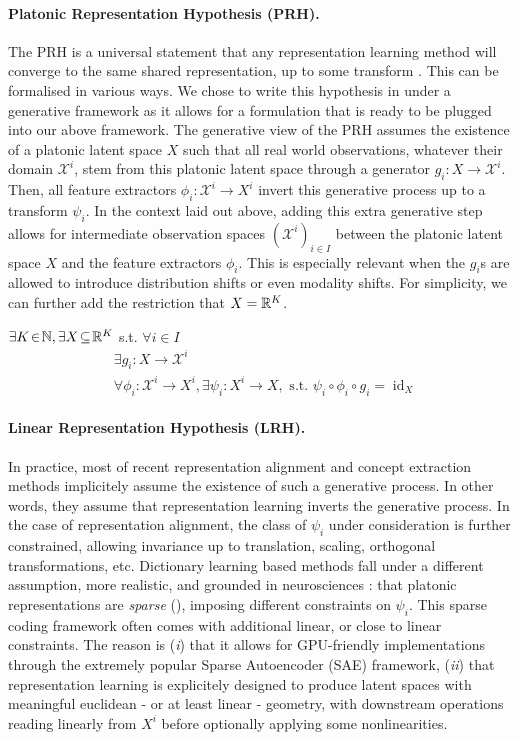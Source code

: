 \documentclass{article}
\begin{document}
\paragraph{Platonic Representation Hypothesis (PRH).} The PRH is a universal statement that any representation learning method will converge to the same shared representation, up to some transform \citep{TODO}. This can be formalised in various ways. We chose to write this hypothesis in under a generative framework as it allows for a formulation that is ready to be plugged into our above framework. The generative view of the PRH assumes the existence of a platonic latent space $X$ such that all real world observations, whatever their domain $\mathcal{X}^i$, stem from this platonic latent space through a generator $g_i : X \to \mathcal{X}^i$. Then, all feature extractors $\phi_i : \mathcal{X}^i \to X^i$ invert this generative process up to a transform $\psi_i$. In the context laid out above, adding this extra generative step allows for intermediate observation spaces $(\mathcal{X}^i)_{i \in I}$ between the platonic latent space $X$ and the feature extractors $\phi_i$. This is especially relevant when the $g_i$s are allowed to introduce distribution shifts or even modality shifts. For simplicity, we can further add the restriction that $X = \mathbb{R}^K$.

\begin{hypothesis}
\label{hyp:generative_process}
$\exists K\!\in\!\mathbb{N}, \exists X\!\subseteq\!\mathbb{R}^{K}$ s.t. $\forall i\!\in\!I$
%
\begin{align}
    &\exists g_i:X\!\to\!\mathcal{X}^i\\
    &\forall \phi_i:\mathcal{X}^i\!\to\!X^i, \exists \psi_i:X^i\!\to\!X,\text{ s.t. }\psi_i\circ\phi_i\circ g_i=\operatorname{id}_{X}
\end{align}
%
\end{hypothesis}

\paragraph{Linear Representation Hypothesis (LRH).} In practice, most of recent representation alignment and concept extraction methods implicitely assume the existence of such a generative process. In other words, they assume that representation learning inverts the generative process. In the case of representation alignment, the class of $\psi_i$ under consideration is further constrained, allowing invariance up to translation, scaling, orthogonal transformations, etc. Dictionary learning based methods fall under a different assumption, more realistic, and grounded in neurosciences : that platonic representations are \emph{sparse} (), imposing different constraints on $\psi_i$. This sparse coding framework often comes with additional linear, or close to linear constraints. The reason is (\emph{i}) that it allows for GPU-friendly implementations through the extremely popular Sparse Autoencoder (SAE) framework, (\emph{ii}) that representation learning is explicitely designed to produce latent spaces with meaningful euclidean - or at least linear - geometry, with downstream operations reading linearly from $X^i$ before optionally applying some nonlinearities.
\end{document}
